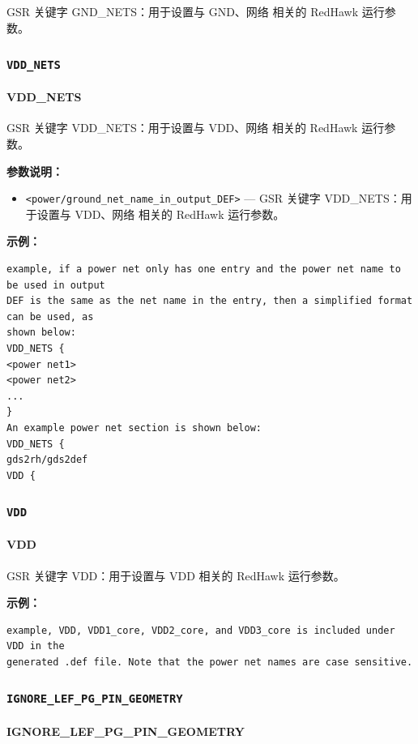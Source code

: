 GSR 关键字 GND_NETS：用于设置与 GND、网络 相关的 RedHawk 运行参数。

\subsubsection{\texttt{VDD_NETS}}
\paragraph*{VDD_NETS}

GSR 关键字 VDD_NETS：用于设置与 VDD、网络 相关的 RedHawk 运行参数。

\textbf{参数说明：}
\begin{itemize}
\item \texttt{<power/ground\_net\_name\_in\_output\_DEF>} — GSR 关键字 VDD\_NETS：用于设置与 VDD、网络 相关的 RedHawk 运行参数。
\end{itemize}

\textbf{示例：}
\begin{lstlisting}
example, if a power net only has one entry and the power net name to be used in output
DEF is the same as the net name in the entry, then a simplified format can be used, as
shown below:
VDD_NETS {
<power net1>
<power net2>
...
}
An example power net section is shown below:
VDD_NETS {
gds2rh/gds2def
VDD {
\end{lstlisting}

\subsubsection{\texttt{VDD}}
\paragraph*{VDD}

GSR 关键字 VDD：用于设置与 VDD 相关的 RedHawk 运行参数。

\textbf{示例：}
\begin{lstlisting}
example, VDD, VDD1_core, VDD2_core, and VDD3_core is included under VDD in the
generated .def file. Note that the power net names are case sensitive.
\end{lstlisting}

\subsubsection{\texttt{IGNORE_LEF_PG_PIN_GEOMETRY}}
\paragraph*{IGNORE_LEF_PG_PIN_GEOMETRY}

